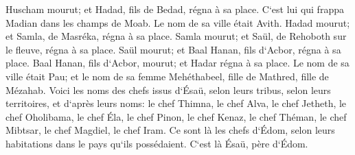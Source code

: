 \verse Huscham mourut; et Hadad, fils de Bedad, régna à sa place. C`est lui qui frappa Madian dans les champs de Moab. Le nom de sa ville était Avith. 
\verse Hadad mourut; et Samla, de Masréka, régna à sa place. 
\verse Samla mourut; et Saül, de Rehoboth sur le fleuve, régna à sa place. 
\verse Saül mourut; et Baal Hanan, fils d`Acbor, régna à sa place. 
\verse Baal Hanan, fils d`Acbor, mourut; et Hadar régna à sa place. Le nom de sa ville était Pau; et le nom de sa femme Mehéthabeel, fille de Mathred, fille de Mézahab. 
\verse Voici les noms des chefs issus d`Ésaü, selon leurs tribus, selon leurs territoires, et d`après leurs noms: le chef Thimna, le chef Alva, le chef Jetheth, 
\verse le chef Oholibama, le chef Éla, le chef Pinon, 
\verse le chef Kenaz, le chef Théman, le chef Mibtsar, 
\verse le chef Magdiel, le chef Iram. Ce sont là les chefs d`Édom, selon leurs habitations dans le pays qu`ils possédaient. C`est là Ésaü, père d`Édom. 

